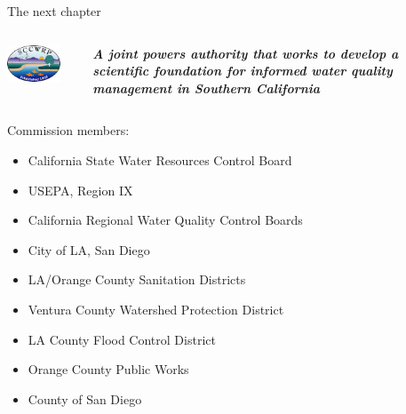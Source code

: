 \documentclass[serif]{beamer}\usepackage[]{graphicx}\usepackage[]{color}
\newcommand{\emtxt}[1]{\textbf{\textit{#1}}}
\begin{document}
\begin{frame}[t]{The next chapter}{}
\begin{columns}
\begin{column}{0.3\textwidth}
\centerline{\includegraphics[width = 0.8\textwidth]{fig/sccwrp.png}}
\end{column}
\begin{column}{0.7\textwidth}
\emtxt{A joint powers authority that works to develop a scientific foundation for informed water quality management in Southern California}
\end{column}
\end{columns}
\vspace{0.1in}
Commission members:
{\footnotesize
\begin{itemize}
\item California State Water Resources Control Board
\item USEPA, Region IX
\item California Regional Water Quality Control Boards
\item City of LA, San Diego
\item LA/Orange County Sanitation Districts
\item Ventura County Watershed Protection District
\item LA County Flood Control District
\item Orange County Public Works
\item County of San Diego
\end{itemize}
}
\end{frame}
\end{document}
